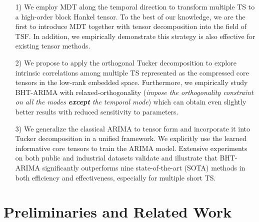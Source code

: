\documentclass[letterpaper]{article} %
\numberwithin{theorem}{section}
\begin{document}
	\begin{enumerate}
		\item [1)]  We  employ  MDT along the temporal direction to transform  multiple TS to a high-order block Hankel tensor.  To the best of our knowledge, we are the first  to introduce MDT together with tensor decomposition into  the field of TSF. In addition, we empirically demonstrate this strategy is also  effective for existing  tensor  methods.
		\item  [2)]   We propose to apply the  orthogonal  Tucker decomposition   to explore  intrinsic   correlations among  multiple TS  represented as the compressed core tensors     in the low-rank embedded  space.  Furthermore, we empirically study  BHT-ARIMA with relaxed-orthogonality (\textit{impose the   orthogonality  constraint  on all the modes  \textbf{except}    the  temporal mode}) which can obtain even slightly better  results with reduced sensitivity to  parameters.
		\item [3)]  We generalize the classical  ARIMA to tensor form and  incorporate it into   Tucker decomposition in a unified framework. We explicitly use the learned informative core tensors  to train the ARIMA model. Extensive experiments  on both public and industrial datasets validate and illustrate    that BHT-ARIMA significantly outperforms nine state-of-the-art (SOTA) methods in both efficiency and effectiveness, especially for multiple short TS.
	\end{enumerate}





\section {Preliminaries and Related Work}
\end{document}
